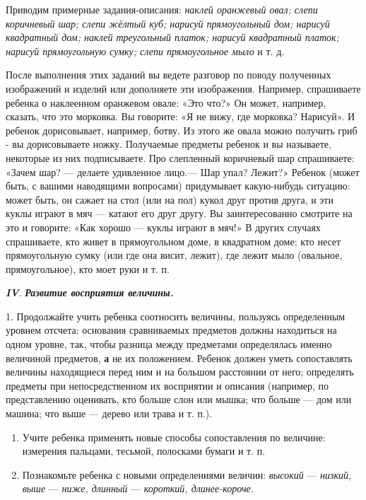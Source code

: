 \documentclass[a5paper]{book}
\renewcommand{\emph}[1]{\textit{#1}}
\begin{document}
Приводим примерные задания-описания: \emph{наклей оранжевый овал; слепи
коричневый шар; слепи жёлтый куб; нарисуй прямоугольный дом; нарисуй
квадратный дом; наклей треугольный платок; нарисуй квадратный платок;
нарисуй прямоугольную сумку; слепи прямоугольное мыло} и т. д.

После выполнения этих заданий вы ведете разговор по поводу полученных
изображений и изделий или дополняете эти изображения. Например,
спрашиваете ребенка о наклеенном оранжевом овале: «Это что?» Он может,
например, сказать, что это морковка. Вы говорите: «Я не вижу, где
морковка? Нарисуй». И ребенок дорисовывает, например, ботву. Из этого же
овала можно получить гриб - вы дорисовываете ножку. Получаемые предметы
ребенок и вы называете, некоторые из них подписываете. Про слепленный
коричневый шар спрашиваете: «Зачем шар? --- делаете удивленное лицо.---
Шар упал? Лежит?» Ребенок (может быть, с вашими наводящими вопросами)
придумывает какую-нибудь ситуацию: может быть, он сажает на стол (или на
пол) кукол друг против друга, и эти куклы играют в мяч --- катают его
друг другу. Вы заинтересованно смотрите на это и говорите: «Как хорошо
--- куклы играют в мяч!» В других случаях спрашиваете, кто живет в
прямоугольном доме, в квадратном доме; кто несет прямоугольную сумку
(или где она висит, лежит), где лежит мыло (овальное, прямоугольное),
кто моет руки и т. п.

\emph{\textbf{IV}}. \emph{\textbf{Развитие восприятия величины.}}

1. Продолжайте учить ребенка соотносить величины, пользуясь определенным
уровнем отсчета: основания сравниваемых предметов должны находиться на
одном уровне, так, чтобы разница между предметами определялась именно
величиной предметов, \textbf{а} не их положением. Ребенок должен уметь
сопоставлять величины находящиеся перед ним и на большом расстоянии от
него; определять предметы при непосредственном их восприятии и описания
(например, по представлению оценивать, кто больше слон или мышка; что
больше --- дом или машина; что выше --- дерево или трава и т. п.).


\begin{enumerate}
\def\labelenumi{\arabic{enumi}.}
\setcounter{enumi}{1}
\item
  
  Учите ребенка применять новые способы сопоставления по величине:
  измерения пальцами, тесьмой, полосками бумаги и т. п.
  
\item
  
  Познакомьте ребенка с новыми определениями величин: \emph{высокий} ---
  \emph{низкий, выше} --- \emph{ниже, длинный} --- \emph{короткий,
  длинее-короче.}
  
\end{enumerate}
\end{document}
